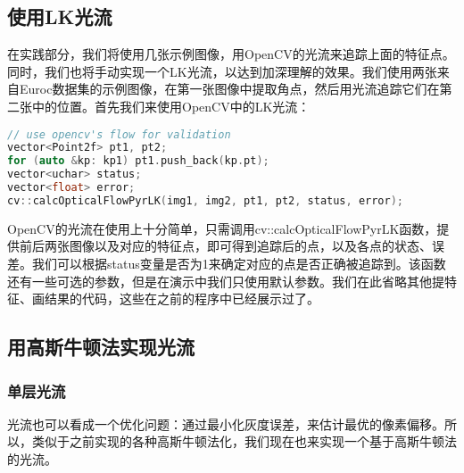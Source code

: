 %
%
\subsection{使用LK光流}
在实践部分，我们将使用几张示例图像，用OpenCV的光流来追踪上面的特征点。同时，我们也将手动实现一个LK光流，以达到加深理解的效果。我们使用两张来自Euroc数据集的示例图像，在第一张图像中提取角点，然后用光流追踪它们在第二张中的位置。首先我们来使用OpenCV中的LK光流：

\begin{lstlisting}[language=c++,caption=slambook2/ch8/optical_flow.cpp（片段）]
// use opencv's flow for validation
vector<Point2f> pt1, pt2;
for (auto &kp: kp1) pt1.push_back(kp.pt);
vector<uchar> status;
vector<float> error;
cv::calcOpticalFlowPyrLK(img1, img2, pt1, pt2, status, error);
\end{lstlisting}

OpenCV的光流在使用上十分简单，只需调用cv::calcOpticalFlowPyrLK函数，提供前后两张图像以及对应的特征点，即可得到追踪后的点，以及各点的状态、误差。我们可以根据status变量是否为1来确定对应的点是否正确被追踪到。该函数还有一些可选的参数，但是在演示中我们只使用默认参数。我们在此省略其他提特征、画结果的代码，这些在之前的程序中已经展示过了。

\subsection{用高斯牛顿法实现光流}
\subsubsection{单层光流}
光流也可以看成一个优化问题：通过最小化灰度误差，来估计最优的像素偏移。所以，类似于之前实现的各种高斯牛顿法化，我们现在也来实现一个基于高斯牛顿法的光流。

